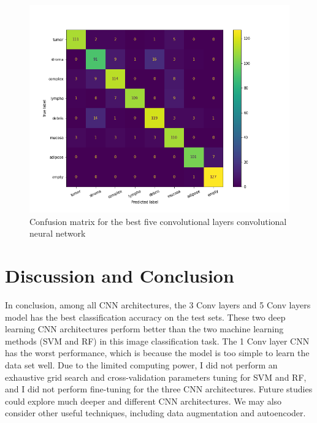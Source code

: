 \documentclass[letterpaper]{article} %
\begin{document}
\begin{figure}[t]
\centering
\includegraphics[width=0.9\columnwidth]{figures/confusion_matrix.png} 
\caption{Confusion matrix for the best five convolutional layers convolutional neural network}
\label{cm}
\end{figure}

\section{Discussion and Conclusion}

In conclusion, among all CNN architectures, the 3 Conv layers and  5 Conv layers model has the best classification accuracy on the test sets. These two deep learning CNN architectures perform better than the two machine learning methods (SVM and RF) in this image classification task. The 1 Conv layer CNN has the worst performance, which is because the model is too simple to learn the data set well. Due to the limited computing power, I did not perform an exhaustive grid search and cross-validation parameters tuning for SVM and RF, and I did not perform fine-tuning for the three CNN architectures. Future studies could explore much deeper and different CNN architectures. We may also consider other useful techniques, including data augmentation and autoencoder. 



\appendix



\end{document}

